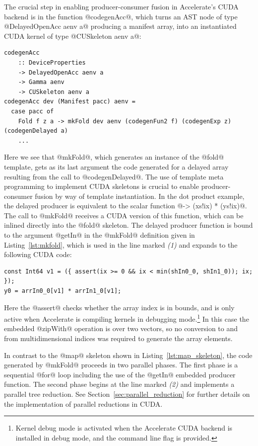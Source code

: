 The crucial step in enabling producer-consumer fusion in Accelerate's CUDA
backend is in the function @codegenAcc@, which turns an AST node of type
@DelayedOpenAcc aenv a@ producing a manifest array, into an instantiated CUDA
kernel of type @CUSkeleton aenv a@:
%
\begin{lstlisting}[style=haskell]
codegenAcc
    :: DeviceProperties
    -> DelayedOpenAcc aenv a
    -> Gamma aenv
    -> CUSkeleton aenv a
codegenAcc dev (Manifest pacc) aenv =
  case pacc of
    Fold f z a -> mkFold dev aenv (codegenFun2 f) (codegenExp z) (codegenDelayed a)
    ...
\end{lstlisting}
%
Here we see that @mkFold@, which generates an instance of the @fold@
template, gets as its last argument the code generated for a delayed array
resulting from the call to @codegenDelayed@. The use of template meta
programming to implement CUDA skeletons is crucial to enable producer-consumer
fusion by way of template instantiation. In the dot product example, the delayed
producer is equivalent to the scalar function @\ix -> (xs!ix) * (ys!ix)@.
The call to @mkFold@ receives a CUDA version of this function, which can be
inlined directly into the @fold@ skeleton. The delayed producer function is
bound to the argument @getIn@ in the @mkFold@ definition given in
Listing~\ref{lst:mkfold}, which is used in the line marked \emph{(1)} and
expands to the following CUDA code:
%
\begin{lstlisting}[style=haskell]
const Int64 v1 = ({ assert(ix >= 0 && ix < min(shIn0_0, shIn1_0)); ix; });
y0 = arrIn0_0[v1] * arrIn1_0[v1];
\end{lstlisting}
%
Here the @assert@ checks whether the array index is in bounds, and is only
active when Accelerate is compiling kernels in debugging mode.\footnote{Kernel
debug mode is activated when the Accelerate CUDA backend is installed in debug
mode, and the command line flag  is provided.} In this case the
embedded @zipWith@ operation is over two vectors, so no conversion to and
from multidimensional indices was required to generate the array elements.

In contrast to the @map@ skeleton shown in Listing~\ref{lst:map_skeleton}, the
code generated by @mkFold@ proceeds in two parallel phases. The first phase is a
sequential @for@ loop including the use of the @getIn@ embedded producer
function. The second phase begins at the line marked \emph{(2)} and implements a
parallel tree reduction. See Section~\ref{sec:parallel_reduction} for further
details on the implementation of parallel reductions in CUDA.

